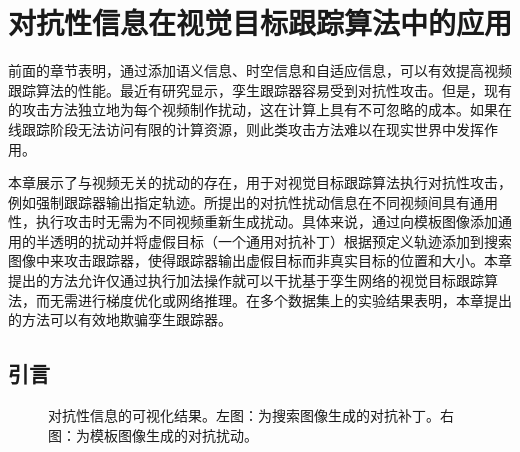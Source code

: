 \chapter{对抗性信息在视觉目标跟踪算法中的应用} \label{chap:attack}
前面的章节表明，通过添加语义信息、时空信息和自适应信息，可以有效提高视频跟踪算法的性能。最近有研究显示，孪生跟踪器容易受到对抗性攻击。但是，现有的攻击方法独立地为每个视频制作扰动，这在计算上具有不可忽略的成本。如果在线跟踪阶段无法访问有限的计算资源，则此类攻击方法难以在现实世界中发挥作用。

本章展示了与视频无关的扰动的存在，用于对视觉目标跟踪算法执行对抗性攻击，例如强制跟踪器输出指定轨迹。所提出的对抗性扰动信息在不同视频间具有通用性，执行攻击时无需为不同视频重新生成扰动。具体来说，通过向模板图像添加通用的半透明的扰动并将虚假目标（一个通用对抗补丁）根据预定义轨迹添加到搜索图像中来攻击跟踪器，使得跟踪器输出虚假目标而非真实目标的位置和大小。本章提出的方法允许仅通过执行加法操作就可以干扰基于孪生网络的视觉目标跟踪算法，而无需进行梯度优化或网络推理。在多个数据集上的实验结果表明，本章提出的方法可以有效地欺骗孪生跟踪器。

\section{引言}

\begin{figure}[t]
\centering
{} \qquad \qquad 
{}
\caption{对抗性信息的可视化结果。左图：为搜索图像生成的对抗补丁。右图：为模板图像生成的对抗扰动。}
\label{fig:attack}
\end{figure}

